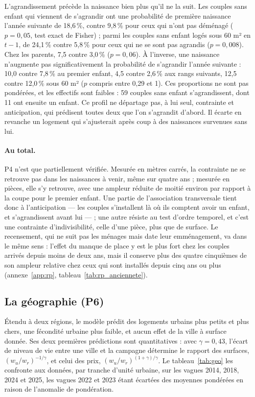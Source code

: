 \documentclass[11pt,a4paper]{article}
\theoremstyle{plain}
\theoremstyle{definition}
\theoremstyle{remark}
\begin{document}
L'agrandissement précède la naissance bien plus qu'il ne la suit. Les couples sans enfant qui viennent de s'agrandir ont une probabilité de première naissance l'année suivante de 18,6\,\%, contre 9,8\,\% pour ceux qui n'ont pas déménagé ($p = 0{,}05$, test exact de Fisher) ; parmi les couples sans enfant logés sous 60 m² en $t-1$, de 24,1\,\% contre 5,8\,\% pour ceux qui ne se sont pas agrandis ($p = 0{,}008$). Chez les parents, 7,5 contre 3,0\,\% ($p = 0{,}06$). À l'inverse, une naissance n'augmente pas significativement la probabilité de s'agrandir l'année suivante : 10,0 contre 7,8\,\% au premier enfant, 4,5 contre 2,6\,\% aux rangs suivants, 12,5 contre 12,0\,\% sous 60 m² ($p$ compris entre 0,29 et 1). Ces proportions ne sont pas pondérées, et les effectifs sont faibles : 59 couples sans enfant s'agrandissent, dont 11 ont ensuite un enfant. Ce profil ne départage pas, à lui seul, contrainte et anticipation, qui prédisent toutes deux que l'on s'agrandit d'abord. Il écarte en revanche un logement qui s'ajusterait après coup à des naissances survenues sans lui.

\paragraph{Au total.} P4 n'est que partiellement vérifiée. Mesurée en mètres carrés, la contrainte ne se retrouve pas dans les naissances à venir, même sur quatre ans ; mesurée en pièces, elle s'y retrouve, avec une ampleur réduite de moitié environ par rapport à la coupe pour le premier enfant. Une partie de l'association transversale tient donc à l'anticipation — les couples s'installent là où ils comptent avoir un enfant, et s'agrandissent avant lui — ; une autre résiste au test d'ordre temporel, et c'est une contrainte d'indivisibilité, celle d'une pièce, plus que de surface. Le recensement, qui ne suit pas les ménages mais date leur emménagement, va dans le même sens : l'effet du manque de place y est le plus fort chez les couples arrivés depuis moins de deux ans, mais il conserve plus des quatre cinquièmes de son ampleur relative chez ceux qui sont installés depuis cinq ans ou plus (annexe~\ref{app:rp}, tableau~\ref{tab:rp_anciennete}).

\subsection{La géographie (P6)}\label{sec:geo}

Étendu à deux régions, le modèle prédit des logements urbains plus petits et plus chers, une fécondité urbaine plus faible, et aucun effet de la ville à surface donnée. Ses deux premières prédictions sont quantitatives : avec $\gamma = 0{,}43$, l'écart de niveau de vie entre une ville et la campagne détermine le rapport des surfaces, $(w_u/w_r)^{-1/\gamma}$, et celui des prix, $(w_u/w_r)^{(1+\gamma)/\gamma}$. Le tableau~\ref{tab:geo} les confronte aux données, par tranche d'unité urbaine, sur les vagues 2014, 2018, 2024 et 2025, les vagues 2022 et 2023 étant écartées des moyennes pondérées en raison de l'anomalie de pondération.
\end{document}
